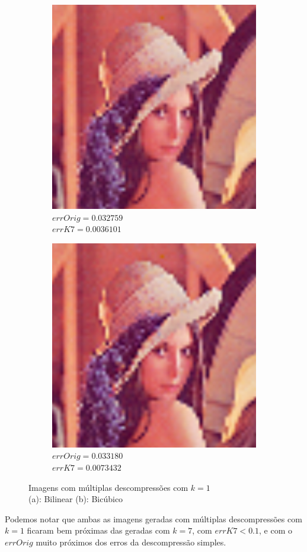 \documentclass[12pt, a4paper]{article}
\begin{document}
    \begin{figure}[h!]
        \begin{center}
        \begin{subfigure}{.3\textwidth}
            \includegraphics[width=.95\textwidth]{../lenaBL111.png}
            \caption{$errOrig = 0.032759$ \\ $errK7 = 0.0036101$}
        \end{subfigure}
        \begin{subfigure}{.3\textwidth}
            \includegraphics[width=.95\textwidth]{../lenaBC111.png}
            \caption{$errOrig = 0.033180$ \\ $errK7 = 0.0073432$}
        \end{subfigure}
        \end{center}
        \caption{Imagens com múltiplas descompressões com $k=1$ \\
                        (a): Bilinear \; (b): Bicúbico}
    \end{figure}

    Podemos notar que ambas as imagens geradas com múltiplas descompressões com
    $k = 1$ ficaram bem próximas das geradas com $k = 7$, com $errK7 < 0.1$, e com
    o $errOrig$ muito próximos dos erros da descompressão simples.
\end{document}
